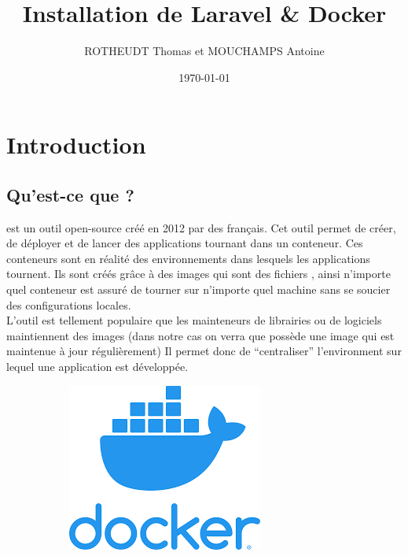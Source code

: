 \documentclass[internal]{nhitec_design}
\author{ROTHEUDT Thomas et MOUCHAMPS Antoine}
\date{\today}
\title{Installation de Laravel \& Docker}
\begin{document}
\maketitle
\newpage
{
\hypersetup{linkcolor=black}
\color{red_nhitec}
\tableofcontents
}

\newpage

\section[Introduction]{Introduction}
    \subsection[Qu'est-ce que Docker?]{Qu'est-ce que \docker{}?}
        
        \docker{} est un outil open-source créé en 2012 par des français. Cet outil permet de créer, de déployer et de lancer des applications tournant dans un conteneur. Ces conteneurs sont en réalité des environnements dans lesquels les applications tournent.
        Ils sont créés grâce à des images qui sont des fichiers \docker{}, ainsi n'importe quel conteneur est assuré de tourner sur n'importe quel machine sans se soucier des configurations locales.\\
        L'outil est tellement populaire que les mainteneurs de librairies ou de logiciels maintiennent des images \docker{} (dans notre cas on verra que \laravelsail{} possède une image \docker{} qui est maintenue à jour régulièrement)
        Il permet donc de ``centraliser'' l'environment sur lequel une application est développée. 

        \begin{figure}[h]
            \centering
            \begin{subfigure}[b]{0.3\textwidth}
                \includegraphics[scale=0.4]{Images_formation/LogoDocker.png}
            \end{subfigure}%
        \end{figure}
        
\end{document}
